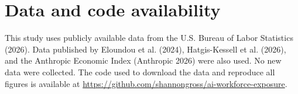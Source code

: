 \section*{Data and code availability}

This study uses publicly available data from the U.S. Bureau of Labor Statistics (2026). Data published by Eloundou et al. (2024), Hatgis-Kessell et al. (2026), and the Anthropic Economic Index (Anthropic 2026) were also used. No new data were collected. The code used to download the data and reproduce all figures is available at \url{https://github.com/shannongross/ai-workforce-exposure}.
